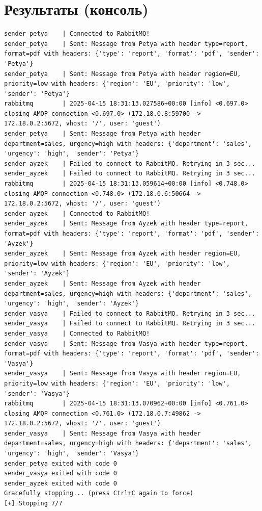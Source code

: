 \documentclass[areasetadvanced]{scrartcl}
\begin{document}
\section{Результаты (консоль)}
\begin{lstlisting}
sender_petya    | Connected to RabbitMQ!
sender_petya    | Sent: Message from Petya with header type=report, format=pdf with headers: {'type': 'report', 'format': 'pdf', 'sender': 'Petya'}
sender_petya    | Sent: Message from Petya with header region=EU, priority=low with headers: {'region': 'EU', 'priority': 'low', 'sender': 'Petya'}
rabbitmq        | 2025-04-15 18:31:13.027586+00:00 [info] <0.697.0> closing AMQP connection <0.697.0> (172.18.0.8:59700 -> 172.18.0.2:5672, vhost: '/', user: 'guest')
sender_petya    | Sent: Message from Petya with header department=sales, urgency=high with headers: {'department': 'sales', 'urgency': 'high', 'sender': 'Petya'}
sender_ayzek    | Failed to connect to RabbitMQ. Retrying in 3 sec...
sender_ayzek    | Failed to connect to RabbitMQ. Retrying in 3 sec...
rabbitmq        | 2025-04-15 18:31:13.059614+00:00 [info] <0.748.0> closing AMQP connection <0.748.0> (172.18.0.6:50664 -> 172.18.0.2:5672, vhost: '/', user: 'guest')
sender_ayzek    | Connected to RabbitMQ!
sender_ayzek    | Sent: Message from Ayzek with header type=report, format=pdf with headers: {'type': 'report', 'format': 'pdf', 'sender': 'Ayzek'}
sender_ayzek    | Sent: Message from Ayzek with header region=EU, priority=low with headers: {'region': 'EU', 'priority': 'low', 'sender': 'Ayzek'}
sender_ayzek    | Sent: Message from Ayzek with header department=sales, urgency=high with headers: {'department': 'sales', 'urgency': 'high', 'sender': 'Ayzek'}
sender_vasya    | Failed to connect to RabbitMQ. Retrying in 3 sec...
sender_vasya    | Failed to connect to RabbitMQ. Retrying in 3 sec...
sender_vasya    | Connected to RabbitMQ!
sender_vasya    | Sent: Message from Vasya with header type=report, format=pdf with headers: {'type': 'report', 'format': 'pdf', 'sender': 'Vasya'}
sender_vasya    | Sent: Message from Vasya with header region=EU, priority=low with headers: {'region': 'EU', 'priority': 'low', 'sender': 'Vasya'}
rabbitmq        | 2025-04-15 18:31:13.070962+00:00 [info] <0.761.0> closing AMQP connection <0.761.0> (172.18.0.7:49862 -> 172.18.0.2:5672, vhost: '/', user: 'guest')
sender_vasya    | Sent: Message from Vasya with header department=sales, urgency=high with headers: {'department': 'sales', 'urgency': 'high', 'sender': 'Vasya'}
sender_petya exited with code 0
sender_vasya exited with code 0
sender_ayzek exited with code 0
Gracefully stopping... (press Ctrl+C again to force)
[+] Stopping 7/7
\end{lstlisting}
\newpage
\end{document}
